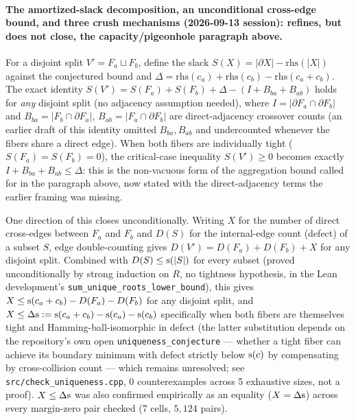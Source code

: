 \paragraph{The amortized-slack decomposition, an unconditional
cross-edge bound, and three crush mechanisms (2026-09-13 session):
refines, but does not close, the capacity/pigeonhole paragraph above.}
For a disjoint split $V'=F_a\sqcup F_b$, define the slack
$S(X)=|\partial X|-\mathrm{rhs}(|X|)$ against the conjectured bound and
$\Delta=\mathrm{rhs}(c_a)+\mathrm{rhs}(c_b)-\mathrm{rhs}(c_a+c_b)$. The
exact identity
$S(V')=S(F_a)+S(F_b)+\Delta-(I+B_{ba}+B_{ab})$ holds for \emph{any}
disjoint split (no adjacency assumption needed), where
$I=|\partial F_a\cap\partial F_b|$ and $B_{ba}=|F_b\cap\partial F_a|$,
$B_{ab}=|F_a\cap\partial F_b|$ are direct-adjacency crossover counts
(an earlier draft of this identity omitted $B_{ba},B_{ab}$ and
undercounted whenever the fibers share a direct edge). When both
fibers are individually tight ($S(F_a)=S(F_b)=0$), the critical-case
inequality $S(V')\ge0$ becomes exactly $I+B_{ba}+B_{ab}\le\Delta$: this
is the non-vacuous form of the aggregation bound called for in the
paragraph above, now stated with the direct-adjacency terms the
earlier framing was missing.

One direction of this closes unconditionally. Writing $X$ for the
number of direct cross-edges between $F_a$ and $F_b$ and $D(S)$ for
the internal-edge count (defect) of a subset $S$, edge double-counting
gives $D(V')=D(F_a)+D(F_b)+X$ for any disjoint split. Combined with
$D(S)\le\mathrm{s}(|S|)$ for every subset (proved unconditionally by strong
induction on $R$, no tightness hypothesis, in the Lean development's
\texttt{sum\_unique\_roots\_lower\_bound}), this gives
$X\le\mathrm{s}(c_a+c_b)-D(F_a)-D(F_b)$ for any disjoint split, and
$X\le\Delta\mathrm{s}:=\mathrm{s}(c_a+c_b)-\mathrm{s}(c_a)-\mathrm{s}(c_b)$ specifically
when both fibers are themselves tight and Hamming-ball-isomorphic in
defect (the latter substitution depends on the repository's own open
\texttt{uniqueness\_conjecture} --- whether a tight fiber can achieve
its boundary minimum with defect strictly below $\mathrm{s}(c)$ by
compensating by cross-collision count --- which remains unresolved;
see \texttt{src/check\_uniqueness.cpp}, 0 counterexamples across 5
exhaustive sizes, not a proof). $X\le\Delta\mathrm{s}$ was also confirmed
empirically as an equality ($X=\Delta\mathrm{s}$) across every margin-zero
pair checked (7 cells, $5{,}124$ pairs).

